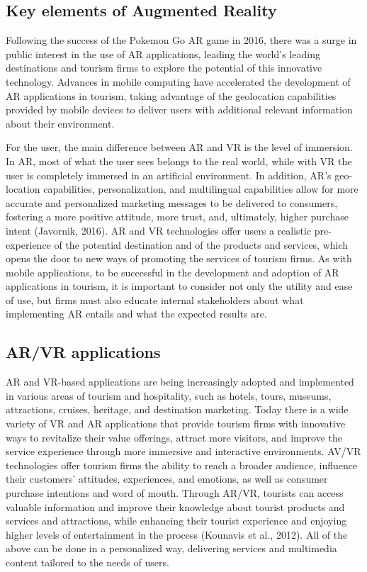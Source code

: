 \documentclass[
  letterpaper,
  DIV=11,
  numbers=noendperiod]{scrreprt}
\begin{document}
\hypertarget{key-elements-of-augmented-reality}{%
\subsection{Key elements of Augmented
Reality}\label{key-elements-of-augmented-reality}}

Following the success of the Pokemon Go AR game in 2016, there was a
surge in public interest in the use of AR applications, leading the
world's leading destinations and tourism firms to explore the potential
of this innovative technology. Advances in mobile computing have
accelerated the development of AR applications in tourism, taking
advantage of the geolocation capabilities provided by mobile devices to
deliver users with additional relevant information about their
environment.

For the user, the main difference between AR and VR is the level of
immersion. In AR, most of what the user sees belongs to the real world,
while with VR the user is completely immersed in an artificial
environment. In addition, AR's geo-location capabilities,
personalization, and multilingual capabilities allow for more accurate
and personalized marketing messages to be delivered to consumers,
fostering a more positive attitude, more trust, and, ultimately, higher
purchase intent (Javornik, 2016). AR and VR technologies offer users a
realistic pre-experience of the potential destination and of the
products and services, which opens the door to new ways of promoting the
services of tourism firms. As with mobile applications, to be successful
in the development and adoption of AR applications in tourism, it is
important to consider not only the utility and ease of use, but firms
must also educate internal stakeholders about what implementing AR
entails and what the expected results are.

\hypertarget{arvr-applications}{%
\subsection{AR/VR applications}\label{arvr-applications}}

AR and VR-based applications are being increasingly adopted and
implemented in various areas of tourism and hospitality, such as hotels,
tours, museums, attractions, cruises, heritage, and destination
marketing. Today there is a wide variety of VR and AR applications that
provide tourism firms with innovative ways to revitalize their value
offerings, attract more visitors, and improve the service experience
through more immersive and interactive environments. AV/VR technologies
offer tourism firms the ability to reach a broader audience, influence
their customers' attitudes, experiences, and emotions, as well as
consumer purchase intentions and word of mouth. Through AR/VR, tourists
can access valuable information and improve their knowledge about
tourist products and services and attractions, while enhancing their
tourist experience and enjoying higher levels of entertainment in the
process (Kounavis et al., 2012). All of the above can be done in a
personalized way, delivering services and multimedia content tailored to
the needs of users.
\end{document}
